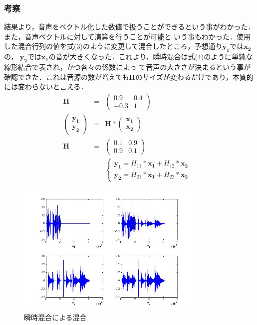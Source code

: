 \documentclass[a4j]{jarticle}
\begin{document}
\subsubsection{考察}
結果より，音声をベクトル化した数値で扱うことができるという事がわかった．また，音声ベクトルに対して演算を行うことが可能と
いう事もわかった．使用した混合行列の値を式(3)のように変更して混合したところ，予想通り$\bm{y_1}$では$\bm{x_2}$の，
$\bm{y_2}$では$\bm{x_1}$の音が大きくなった．これより，瞬時混合は式(4)のように単純な線形結合で表され，かつ各々の係数によっ
て音声の大きさが決まるという事が確認できた．これは音源の数が増えても$\bm{H}$のサイズが変わるだけであり，本質的には変わらないと言える．
\begin{eqnarray}
\bm{H} &=& \left(
 \begin{array}{cc}
  0.9 & 0.4\\
  -0.3 & 1
 \end{array}
\right) \\
\left(
\begin{array}{c}
 \bm{y_1}\\
\bm{y_2}
\end{array}
\right)
&=& \bm{H} * 
\left(
\begin{array}{c}
 \bm{x_1}\\
 \bm{x_2}
\end{array}
\right)\\
\bm{H} &=& \left(
 \begin{array}{cc}
  0.1 & 0.9\\
  0.9 & 0.1
 \end{array}
\right) \\
&&
\begin{cases}
 \bm{y_1} = H_{11} * \bm{x_1} +  H_{12} * \bm{x_2} &  \\
 \bm{y_2} = H_{21} * \bm{x_1} +  H_{22} * \bm{x_2} &
\end{cases}
\end{eqnarray}

\begin{figure}[htb]
 \begin{center}
  \includegraphics[width=9cm, clip, bb=0 0 648 460]{pic/k1s1.jpg}
  \caption{瞬時混合による混合}
  \label{k1s1}
 \end{center}
\end{figure}
\end{document}
